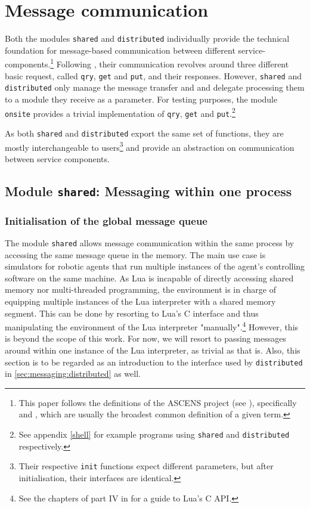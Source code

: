 \chapter{Message communication}
\label{chap:messaging}

Both the modules \texttt{shared} and \texttt{distributed} individually provide the technical foundation for message-based communication between different service-components.\footnote{This paper follows the definitions of the ASCENS project (see \cite{ASCENS}), specifically \cite{AscensD41} and \cite{HoelzlWirsing2011}, which are usually the broadest common definition of a given term.} Following \cite{AscensD11}, their communication revolves around three different basic request, called \texttt{qry}, \texttt{get} and \texttt{put}, and their responses. However, \texttt{shared} and \texttt{distributed} only manage the message transfer and and delegate processing them to a module they receive as  a parameter. For testing purposes, the module \texttt{onsite} provides a trivial implementation of \texttt{qry}, \texttt{get} and \texttt{put}.\footnote{See appendix \ref{shell} for example programs using \texttt{shared} and \texttt{distributed} respectively.}

As both \texttt{shared} and \texttt{distributed} export the same set of functions, they are mostly interchangeable to users\footnote{Their respective \texttt{init} functions expect different parameters, but after initialisation, their interfaces are identical.} and provide an abstraction on communication between service components.

\section{Module \texttt{shared}: Messaging within one process}
\label{sec:messages:distributed}

\subsection{Initialisation of the global message queue}

The module \texttt{shared} allows message communication within the same process by accessing the same message queue in the memory. The main use case is simulators for robotic agents that run multiple instances of the agent's controlling software on the same machine. As Lua is incapable of directly accessing shared memory nor multi-threaded programming, the environment is in charge of equipping multiple instances of the Lua interpreter with a shared memory segment. This can be done by resorting to Lua's C interface and thus manipulating the environment of the Lua interpreter "manually".\footnote{See the chapters of part IV in \cite{Ierusalimschy2006} for a guide to Lua's C API.} However, this is beyond the scope of this work. For now, we will resort to passing messages around within one instance of the Lua interpreter, as trivial as that is. Also, this section is to be regarded as an introduction to the interface used by \texttt{distributed} in \ref{sec:messaging:distributed} as well.

